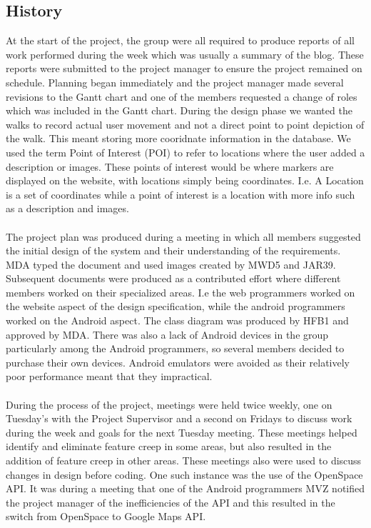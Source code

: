 \documentclass[12pt]{article}
\begin{document}
\subsection{History}
At the start of the project, the group were all required to produce reports of all work performed during the week which was usually a summary of the blog. These reports were submitted to the project manager to ensure the project remained on schedule. Planning began immediately and the project manager made several revisions to the Gantt chart and one of the members requested a change of roles which was included in the Gantt chart. During the design phase we wanted the walks to record actual user movement and not a direct point to point depiction of the walk. This meant storing more cooridnate information in the database. We used the term Point of Interest (POI) to refer to locations where the user added a description or images. These points of interest would be where markers are displayed on the website, with locations simply being coordinates. I.e. A Location is a set of coordinates while a point of interest is a location with more info such as a description and images.
\\\\
The project plan was produced during a meeting in which all members suggested the initial design of the system and their understanding of the requirements. MDA typed the document and used images created by MWD5 and JAR39. Subsequent documents were produced as a contributed effort where different members worked on their specialized areas. I.e the web programmers worked on the website aspect of the design specification, while the android programmers worked on the Android aspect. The class diagram was produced by HFB1 and approved by MDA. There was also a lack of Android devices in the group particularly among the Android programmers, so several members decided to purchase their own devices. Android emulators were avoided as their relatively poor performance meant that they impractical.
\\\\
During the process of the project, meetings were held twice weekly, one on Tuesday's with the Project Supervisor and a second on Fridays to discuss work during the week and goals for the next Tuesday meeting. These meetings helped identify and eliminate feature creep in some areas, but also resulted in the addition of feature creep in other areas. These meetings also were used to discuss changes in design before coding. One such instance was the use of the OpenSpace API. It was during a meeting that one of the Android programmers MVZ notified the project manager of the inefficiencies of the API and this resulted in the switch from OpenSpace to Google Maps API.
\end{document}

